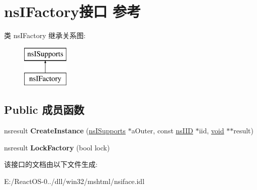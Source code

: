 \hypertarget{interfacens_i_factory}{}\section{ns\+I\+Factory接口 参考}
\label{interfacens_i_factory}
类 ns\+I\+Factory 继承关系图\+:\begin{figure}[H]
\begin{center}
\leavevmode
\includegraphics[height=2.000000cm]{interfacens_i_factory}
\end{center}
\end{figure}
\subsection*{Public 成员函数}
\begin{DoxyCompactItemize}
\item 
\mbox{\label{interfacens_i_factory_aa140b104a9bc02feb1e410d465fa4ddf}} 
nsresult {\bfseries Create\+Instance} (\hyperlink{interfacens_i_supports}{ns\+I\+Supports} $\ast$a\+Outer, const \hyperlink{struct___i_i_d}{ns\+I\+ID} $\ast$iid, \hyperlink{interfacevoid}{void} $\ast$$\ast$result)
\item 
\mbox{\label{interfacens_i_factory_a8365d71b1624111577bcb3f8d627ff69}} 
nsresult {\bfseries Lock\+Factory} (bool lock)
\end{DoxyCompactItemize}


该接口的文档由以下文件生成\+:\begin{DoxyCompactItemize}
\item 
E\+:/\+React\+O\+S-\/0../dll/win32/mshtml/nsiface.\+idl\end{DoxyCompactItemize}
